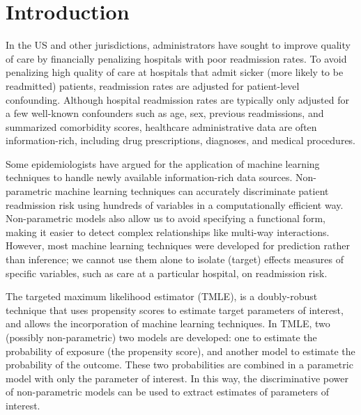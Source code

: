 \documentclass[]{article}\usepackage[]{graphicx}\usepackage[]{color}
\begin{document}
\section{Introduction}
In the US and other jurisdictions, administrators have sought to improve quality of care by financially penalizing hospitals with poor readmission rates.\supercite{institute_of_medicine_u.s.._division_of_health_care_services_medicare_1990} To avoid penalizing high quality of care at hospitals that admit sicker (more likely to be readmitted) patients, readmission rates are adjusted for patient-level confounding.\supercite{us_government_public_2012} Although hospital readmission rates are typically only adjusted for a few well-known confounders such as age, sex, previous readmissions, and summarized comorbidity scores,\supercite{kansagara_risk_2011} healthcare administrative data are often information-rich, including drug prescriptions, diagnoses, and medical procedures.

Some epidemiologists have argued for the application of machine learning techniques to handle newly available information-rich data sources.\supercite{glymour_invited_2013} Non-parametric machine learning techniques can accurately discriminate patient readmission risk using hundreds of variables in a computationally efficient way.\supercite{friedman_regularization_2010} Non-parametric models also allow us to avoid specifying a functional form, making it easier to detect complex relationships like multi-way interactions. However, most machine learning techniques were developed for prediction rather than inference; we cannot use them alone to isolate (target) effects measures of specific variables, such as care at a particular hospital, on readmission risk.

The targeted maximum likelihood estimator (TMLE), is a doubly-robust technique that uses propensity scores to estimate target parameters of interest, and allows the incorporation of machine learning techniques.\supercite{van_der_laan_targeted_2011}  In TMLE, two (possibly non-parametric) two models are developed: one to estimate the probability of exposure (the propensity score), and another model to estimate the probability of the outcome. These two probabilities are combined in a parametric model with only the parameter of interest. In this way, the discriminative power of non-parametric models can be used to extract estimates of parameters of interest.
\end{document}
